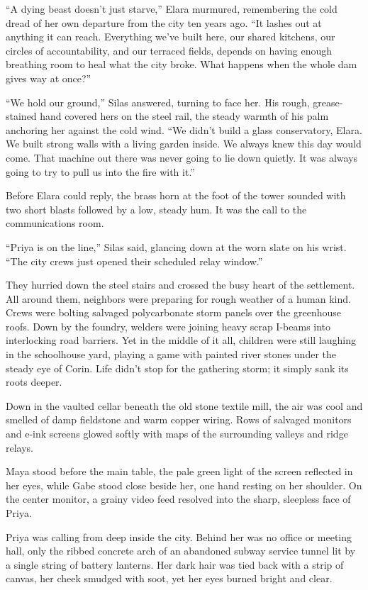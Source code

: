 ``A dying beast doesn't just starve,'' Elara murmured, remembering the cold dread of her own departure from the city ten years ago. ``It lashes out at anything it can reach. Everything we've built here, our shared kitchens, our circles of accountability, and our terraced fields, depends on having enough breathing room to heal what the city broke. What happens when the whole dam gives way at once?''

``We hold our ground,'' Silas answered, turning to face her. His rough, grease-stained hand covered hers on the steel rail, the steady warmth of his palm anchoring her against the cold wind. ``We didn't build a glass conservatory, Elara. We built strong walls with a living garden inside. We always knew this day would come. That machine out there was never going to lie down quietly. It was always going to try to pull us into the fire with it.''

Before Elara could reply, the brass horn at the foot of the tower sounded with two short blasts followed by a low, steady hum. It was the call to the communications room.

``Priya is on the line,'' Silas said, glancing down at the worn slate on his wrist. ``The city crews just opened their scheduled relay window.''

They hurried down the steel stairs and crossed the busy heart of the settlement. All around them, neighbors were preparing for rough weather of a human kind. Crews were bolting salvaged polycarbonate storm panels over the greenhouse roofs. Down by the foundry, welders were joining heavy scrap I-beams into interlocking road barriers. Yet in the middle of it all, children were still laughing in the schoolhouse yard, playing a game with painted river stones under the steady eye of Corin. Life didn't stop for the gathering storm; it simply sank its roots deeper.

Down in the vaulted cellar beneath the old stone textile mill, the air was cool and smelled of damp fieldstone and warm copper wiring. Rows of salvaged monitors and e-ink screens glowed softly with maps of the surrounding valleys and ridge relays.

Maya stood before the main table, the pale green light of the screen reflected in her eyes, while Gabe stood close beside her, one hand resting on her shoulder. On the center monitor, a grainy video feed resolved into the sharp, sleepless face of Priya.

Priya was calling from deep inside the city. Behind her was no office or meeting hall, only the ribbed concrete arch of an abandoned subway service tunnel lit by a single string of battery lanterns. Her dark hair was tied back with a strip of canvas, her cheek smudged with soot, yet her eyes burned bright and clear.

